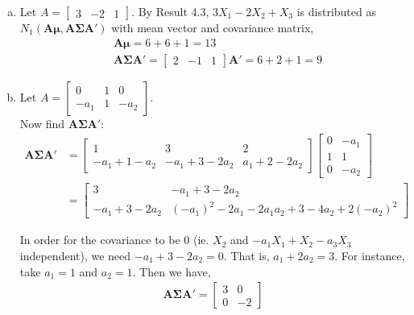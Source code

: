 \documentclass[12pt]{article}\usepackage[]{graphicx}\usepackage[]{color}
\newenvironment{problem}[2][Problem]{\begin{trivlist}
\item[\hskip \labelsep {\bfseries #1}\hskip \labelsep {\bfseries #2.}]}{\end{trivlist}}
\newcommand{\vct}{\mathbf}
\begin{document}
\begin{problem}{4.4}
\end{problem}

\begin{enumerate}[a)]

\item Let $A = \begin{bmatrix} 3 & -2 & 1 \end{bmatrix}$. By Result 4.3, $3X_1 - 2X_2 + X_3$ is distributed as $N_1(\vct{A}\vct{\mu}, \vct{A}\vct{\Sigma}\vct{A}')$ with mean vector and covariance matrix,
\begin{align*}
&\vct{A}\vct{\mu} = 6 + 6 + 1 = 13\\
&\vct{A}\vct{\Sigma}\vct{A}' = \begin{bmatrix} 2 & -1 & 1 \end{bmatrix}\vct{A}' = 6 + 2 + 1 = 9
\end{align*}

\item Let $A = \begin{bmatrix} 0 & 1 & 0 \\ -a_1 & 1 & -a_2 \end{bmatrix}$.\\

Now find $\vct{A}\vct{\Sigma}\vct{A}'$:
\begin{align*}
\vct{A}\vct{\Sigma}\vct{A}' &= \begin{bmatrix} 1 & 3 & 2 \\ -a_1 + 1 - a_2 & -a_1 + 3 - 2a_2 & a_1 + 2 - 2a_2 \end{bmatrix}\begin{bmatrix} 0 & -a_1 \\ 1 & 1 \\ 0 & -a_2 \end{bmatrix}\\
&= \begin{bmatrix} 3 & -a_1 + 3 - 2a_2 \\ -a_1 + 3 - 2a_2 & (-a_1)^2 - 2a_1 - 2a_1a_2 + 3 - 4a_2 + 2(-a_2)^2  \end{bmatrix}
\end{align*}

In order for the covariance to be 0 (ie. $X_2$ and $-a_1X_1 + X_2 - a_3X_3$ independent), we need $-a_1 + 3 - 2a_2 = 0$. That is, $a_1 + 2a_2 = 3$. For instance, take $a_1 = 1$ and $a_2 = 1$. Then we have,
\begin{align*}
\vct{A}\vct{\Sigma}\vct{A}' = \begin{bmatrix} 3 & 0 \\ 0 & -2 \end{bmatrix}
\end{align*}
\end{enumerate}
\end{document}
